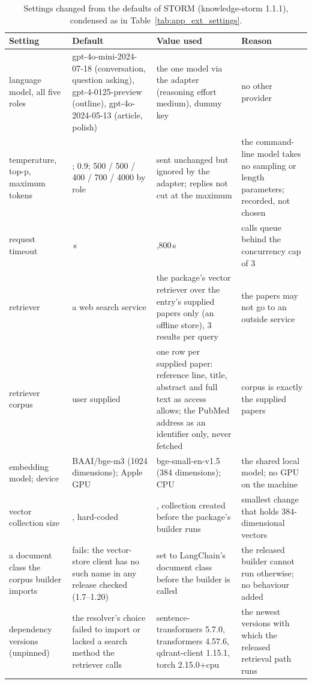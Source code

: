 \documentclass{article} %
\begin{document}
\begin{table}[!htbp]
\caption{Settings changed from the defaults of STORM (knowledge-storm 1.1.1), condensed as in Table~\ref{tab:app_ext_settings}.}
\label{tab:app_ext_settings_storm}
\scriptsize
\setlength{\tabcolsep}{3pt}
\begin{tabularx}{\linewidth}{>{\raggedright\arraybackslash}p{2.9cm}>{\raggedright\arraybackslash}p{2.9cm}>{\raggedright\arraybackslash}p{3.2cm}>{\raggedright\arraybackslash}X}
\toprule
Setting & Default & Value used & Reason \\
\midrule
language model, all five roles & gpt-4o-mini-2024-07-18 (conversation, question asking), gpt-4-0125-preview (outline), gpt-4o-2024-05-13 (article, polish) & the one model via the adapter (reasoning effort medium), dummy key & no other provider \\
temperature, top-p, maximum tokens & 1.0; 0.9; 500 / 500 / 400 / 700 / 4000 by role & sent unchanged but ignored by the adapter; replies not cut at the maximum & the command-line model takes no sampling or length parameters; recorded, not chosen \\
request timeout & 600\,s & 1,800\,s & calls queue behind the concurrency cap of 3 \\
retriever & a web search service & the package's vector retriever over the entry's supplied papers only (an offline store), 3 results per query & the papers may not go to an outside service \\
retriever corpus & user supplied & one row per supplied paper: reference line, title, abstract and full text as access allows; the PubMed address as an identifier only, never fetched & corpus is exactly the supplied papers \\
embedding model; device & BAAI/bge-m3 (1024 dimensions); Apple GPU & bge-small-en-v1.5 (384 dimensions); CPU & the shared local model; no GPU on the machine \\
vector collection size & 1024, hard-coded & 384, collection created before the package's builder runs & smallest change that holds 384-dimensional vectors \\
a document class the corpus builder imports & fails: the vector-store client has no such name in any release checked (1.7--1.20) & set to LangChain's document class before the builder is called & the released builder cannot run otherwise; no behaviour added \\
dependency versions (unpinned) & the resolver's choice failed to import or lacked a search method the retriever calls & sentence-transformers 5.7.0, transformers 4.57.6, qdrant-client 1.15.1, torch 2.15.0+cpu & the newest versions with which the released retrieval path runs \\

\end{tabularx}
\end{table}
\end{document}

